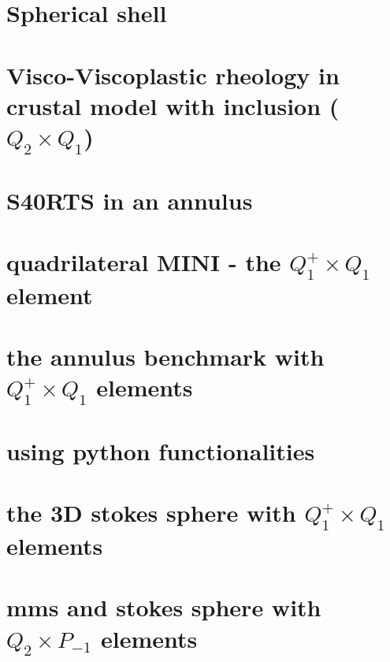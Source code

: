 \documentclass[a4paper,11pt]{report}
\begin{document}
\chapter{Spherical shell \label{f69}} 

\chapter{Visco-Viscoplastic rheology in crustal model with inclusion ($Q_2\times Q_1$) \label{f70}} 

\chapter{S40RTS in an annulus \label{f71}} 

\chapter{quadrilateral MINI - the $Q_1^+\times Q_1$ element \label{f72}} 

\chapter{the annulus benchmark with $Q_1^+\times Q_1$ elements \label{f74}}

\chapter{using python functionalities\label{f73}} 

\chapter{the 3D stokes sphere with $Q_1^+\times Q_1$ elements \label{f75}}

\chapter{mms and stokes sphere with $Q_2\times P_{-1}$ elements \label{f76}}
\end{document}
